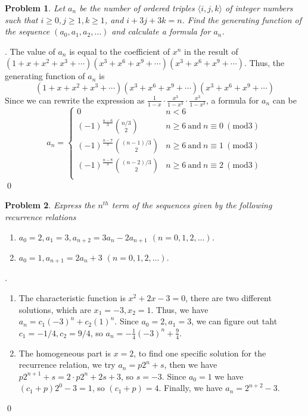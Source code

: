 \documentclass[12pt]{article}
\newtheorem{hw}{Problem}
\newenvironment{sol}
  {\par\vspace{3mm}\noindent{\it Solution}.}
  {\qed}
\begin{document}
\begin{hw}
Let $a_n$ be the number of ordered triples $\langle i,j,k\rangle$ of integer numbers such that $i\geq 0,j\geq 1, k\geq 1$, and $i+3j+3k=n$. Find the generating function of the sequence $(a_0, a_1, a_2, \ldots)$ and calculate a formula for $a_n$.
\end{hw}
\begin{sol}
	The value of $a_n$ is equal to the coefficient of $x^n$ in the result of $(1+x+x^2+x^3+\cdots)(x^3+x^6+x^9+\cdots)(x^3+x^6+x^9+\cdots)$. Thus, the generating function of $a_n$ is $$(1+x+x^2+x^3+\cdots)(x^3+x^6+x^9+\cdots)(x^3+x^6+x^9+\cdots)$$
	Since we can rewrite the expression as $\frac{1}{1-x}\cdot\frac{x^3}{1-x^3}\cdot\frac{x^3}{1-x^3}$, a formula for $a_n$ can be 
	\begin{displaymath}
		a_n = \left\{ 
		\begin{array}{ll}
			0 & n < 6 \\
			(-1)^{\frac{n-6}{3}}{n/3 \choose 2}  & n \geq 6 \ \textrm{and} \ n \equiv 0 \ (\textrm{mod} 3) \\
			(-1)^{\frac{n-7}{3}}{(n-1)/3 \choose 2}  & n \geq 6 \ \textrm{and} \ n \equiv 1 \ (\textrm{mod} 3) \\
			(-1)^{\frac{n-8}{3}}{(n-2)/3 \choose 2}  & n \geq 6 \ \textrm{and} \ n \equiv 2 \ (\textrm{mod} 3) \\
		\end{array}
		\right.
	\end{displaymath}
\end{sol}


\begin{hw}
Express the $n^{th}$ term of the sequences given by the following recurrence relations



\begin{enumerate}
 \item $a_0=2, a_1=3, a_{n+2}=3a_n - 2a_{n+1} $ $(n=0,1,2,\ldots)$.
 \item $a_0=1, a_{n+1}=2a_n+3$ $(n=0,1,2,\ldots).$
\end{enumerate}
\end{hw}
\begin{sol}
	\begin{enumerate}
		\item The characteristic function is $x^2 + 2x -3 = 0$, there are two different solutions, which are $x_1 = -3, x_2 = 1$. Thus, we have $a_n = c_1(-3)^n + c_2(1)^n$. Since $a_0 = 2,a_1 = 3$, we can figure out taht $c_1 = -1/4,c_2 = 9/4$, so $a_n = -\frac{1}{4}(-3)^n + \frac{9}{4}$.
		
		\item The homogeneous part is $x = 2$, to find one specific solution for the recurrence relation, we try $a_n = p2^n + s$, then we have $p2^{n+1} + s = 2\cdot p2^n + 2s + 3$, so $s = -3$. Since $a_0 = 1$ we have $(c_1 + p)2^0 - 3 = 1$, so $(c_1+p) = 4$. Finally, we have $a_n = 2^{n+2} - 3$.
	\end{enumerate}
\end{sol}
\end{document}
